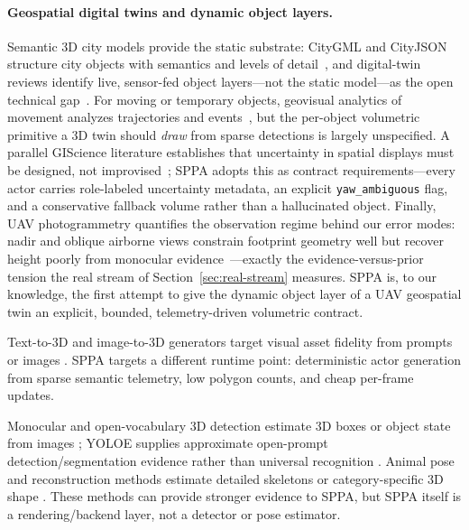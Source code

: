 \documentclass[11pt,a4paper]{article}
\begin{document}
\paragraph{Geospatial digital twins and dynamic object layers.}
Semantic 3D city models provide the static substrate: CityGML and CityJSON
structure city objects with semantics and levels of
detail~\cite{ledoux2019cityjson,biljecki2015applications}, and digital-twin
reviews identify live, sensor-fed object layers---not the static model---as
the open technical gap~\cite{ketzler2020digitaltwins,batty2018digitaltwins}.
For moving or temporary objects, geovisual analytics of movement analyzes
trajectories and events~\cite{andrienko2013movement}, but the per-object
volumetric primitive a 3D twin should \emph{draw} from sparse detections is
largely unspecified. A parallel GIScience literature establishes that
uncertainty in spatial displays must be designed, not
improvised~\cite{maceachren2005visualizing}; SPPA adopts this as contract
requirements---every actor carries role-labeled uncertainty metadata, an
explicit \texttt{yaw\_ambiguous} flag, and a conservative fallback volume
rather than a hallucinated object. Finally, UAV photogrammetry quantifies
the observation regime behind our error modes: nadir and oblique airborne
views constrain footprint geometry well but recover height poorly from
monocular evidence~\cite{nex2014uav}---exactly the evidence-versus-prior
tension the real stream of Section~\ref{sec:real-stream} measures. SPPA is,
to our knowledge, the first attempt to give the dynamic object layer of a
UAV geospatial twin an explicit, bounded, telemetry-driven volumetric
contract.

Text-to-3D and image-to-3D generators target visual asset fidelity from prompts
or images
\cite{poole2022dreamfusion,lin2022magic3d,nichol2022pointe,tochilkin2024triposr,sf3d2024,stability2025spar3d,triposg2025,xu2024instantmesh,xiang2024trellis,xiang2025trellis2,zhao2025hunyuan3d}.
SPPA targets a different runtime point: deterministic actor generation from
sparse semantic telemetry, low polygon counts, and cheap per-frame updates.

Monocular and open-vocabulary 3D detection estimate 3D boxes or object state
from images \cite{brazil2022omni3d,yao2024ovmono3d}; YOLOE supplies approximate
open-prompt detection/segmentation evidence rather than universal recognition
\cite{wang2025yoloe}. Animal pose and
reconstruction methods estimate detailed skeletons or category-specific 3D
shape \cite{yu2021ap10k,li20243dfauna,hu2026sam3danimal}. These methods can
provide stronger evidence to SPPA, but SPPA itself is a rendering/backend layer,
not a detector or pose estimator.
\end{document}
